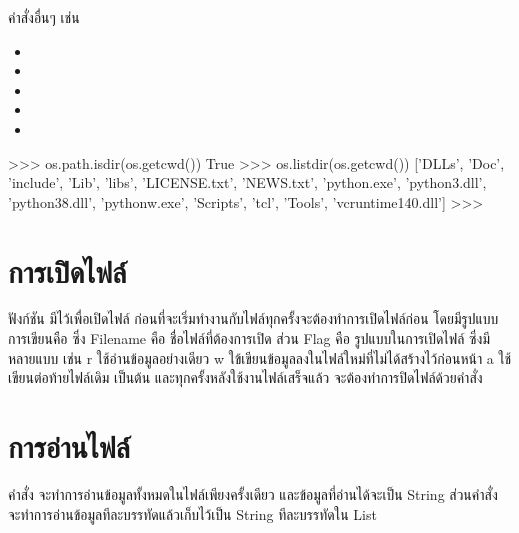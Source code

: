 คำสั่งอื่นๆ เช่น 

\begin{itemize}
\item 	{}
\item 	{} 
\item 	{} 
\item 	{} 
\item 	{}
\end{itemize}

\begin{pycode}
>>> os.path.isdir(os.getcwd())
True
>>> os.listdir(os.getcwd())
['DLLs', 'Doc', 'include', 'Lib', 'libs', 'LICENSE.txt', 'NEWS.txt', 'python.exe', 'python3.dll', 'python38.dll', 'pythonw.exe', 'Scripts', 'tcl', 'Tools', 'vcruntime140.dll']
>>>
\end{pycode}


\section{การเปิดไฟล์}

ฟังก์ชัน มีไว้เพื่อเปิดไฟล์ ก่อนที่จะเริ่มทำงานกับไฟล์ทุกครั้งจะต้องทำการเปิดไฟล์ก่อน โดยมีรูปแบบการเขียนคือ  ซึ่ง Filename คือ ชื่อไฟล์ที่ต้องการเปิด ส่วน Flag คือ รูปแบบในการเปิดไฟล์ ซึ่งมีหลายแบบ เช่น r ใช้อ่านข้อมูลอย่างเดียว w ใข้เขียนข้อมูลลงในไฟล์ใหม่ที่ไม่ได้สร้างไว้ก่อนหน้า a ใช้เขียนต่อท้ายไฟล์เดิม เป็นต้น และทุกครั้งหลังใช้งานไฟล์เสร็จแล้ว จะต้องทำการปิดไฟล์ด้วยคำสั่ง 

\begin{pycode}

\end{pycode}


\section{การอ่านไฟล์}

คำสั่ง  จะทำการอ่านข้อมูลทั้งหมดในไฟล์เพียงครั้งเดียว และข้อมูลที่อ่านได้จะเป็น String ส่วนคำสั่ง  จะทำการอ่านข้อมูลทีละบรรทัดแล้วเก็บไว้เป็น String ทีละบรรทัดใน List

